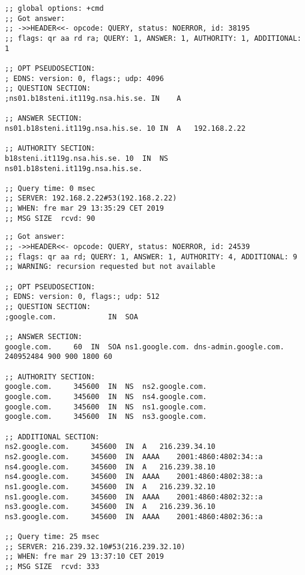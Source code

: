 \documentclass[11pt,a4paper]{article}
\begin{document}
\begin{lstlisting}[caption={Några frågor, dig -t A  ns01.b18steni.it119g.nsa.his.se.}]
;; global options: +cmd
;; Got answer:
;; ->>HEADER<<- opcode: QUERY, status: NOERROR, id: 38195
;; flags: qr aa rd ra; QUERY: 1, ANSWER: 1, AUTHORITY: 1, ADDITIONAL: 1

;; OPT PSEUDOSECTION:
; EDNS: version: 0, flags:; udp: 4096
;; QUESTION SECTION:
;ns01.b18steni.it119g.nsa.his.se. IN	A

;; ANSWER SECTION:
ns01.b18steni.it119g.nsa.his.se. 10 IN	A	192.168.2.22

;; AUTHORITY SECTION:
b18steni.it119g.nsa.his.se. 10	IN	NS	ns01.b18steni.it119g.nsa.his.se.

;; Query time: 0 msec
;; SERVER: 192.168.2.22#53(192.168.2.22)
;; WHEN: fre mar 29 13:35:29 CET 2019
;; MSG SIZE  rcvd: 90
\end{lstlisting}

\begin{lstlisting}[caption={Några frågor, dig -t SOA @ns1.google.com. google.com.}]
;; Got answer:
;; ->>HEADER<<- opcode: QUERY, status: NOERROR, id: 24539
;; flags: qr aa rd; QUERY: 1, ANSWER: 1, AUTHORITY: 4, ADDITIONAL: 9
;; WARNING: recursion requested but not available

;; OPT PSEUDOSECTION:
; EDNS: version: 0, flags:; udp: 512
;; QUESTION SECTION:
;google.com.			IN	SOA

;; ANSWER SECTION:
google.com.		60	IN	SOA	ns1.google.com. dns-admin.google.com. 240952484 900 900 1800 60

;; AUTHORITY SECTION:
google.com.		345600	IN	NS	ns2.google.com.
google.com.		345600	IN	NS	ns4.google.com.
google.com.		345600	IN	NS	ns1.google.com.
google.com.		345600	IN	NS	ns3.google.com.

;; ADDITIONAL SECTION:
ns2.google.com.		345600	IN	A	216.239.34.10
ns2.google.com.		345600	IN	AAAA	2001:4860:4802:34::a
ns4.google.com.		345600	IN	A	216.239.38.10
ns4.google.com.		345600	IN	AAAA	2001:4860:4802:38::a
ns1.google.com.		345600	IN	A	216.239.32.10
ns1.google.com.		345600	IN	AAAA	2001:4860:4802:32::a
ns3.google.com.		345600	IN	A	216.239.36.10
ns3.google.com.		345600	IN	AAAA	2001:4860:4802:36::a

;; Query time: 25 msec
;; SERVER: 216.239.32.10#53(216.239.32.10)
;; WHEN: fre mar 29 13:37:10 CET 2019
;; MSG SIZE  rcvd: 333
\end{lstlisting}
\end{document}
